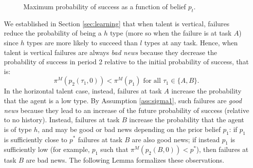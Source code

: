\documentclass[12pt,american]{paper}
\theoremstyle{remark}
\begin{document}
\begin{figure}[h!]
    \centering
    \centering
  \caption{Maximum probability of success as a function of belief $p_t$.}
  \label{fig: success 2}
\end{figure}
%
We established in Section \ref{sec:learning} that when talent is vertical, failures reduce the probability of being a $h$ type (more so when the failure is at task $A$) since $h$ types are more likely to succeed than $l$ types at any task. Hence, when talent is vertical failures are always \textit{bad news} because they decrease the probability of success in period 2 relative to the initial probability of success, that is:
\[
\pi^M(p_2(\tau_1,0))<\pi^M(p_1) \mbox{ for all } \tau_1\in \{A,B\}.
\]
In the horizontal talent case, instead, failures at task $A$ increase the probability that the agent is a low type. By Assumption \ref{ass:sigma1}, such failures are \textit{good news } because they lead to an increase of the future probability of success (relative to no history). Instead, failures at task $B$ increase the probability that the agent is of type $h$, and may be good or bad news depending on the prior belief $p_1$: if $p_1$ is sufficiently close to $p^*$ failures at task $B$ are also good news; if instead $p_1$ is sufficiently low (for example, $p_1$ such that $\pi^M(p_2(B,0))<p^*$), then failures at task $B$ are bad news. The following Lemma formalizes these observations.
\end{document}
